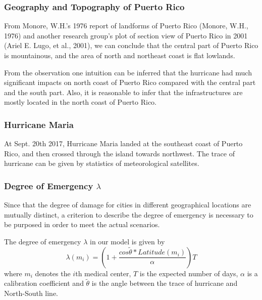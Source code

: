 \documentclass[12pt]{article}
\begin{document}
			\subsubsection{Geography and Topography of Puerto Rico}
			From Monore, W.H.'s 1976 report of landforms of Puerto Rico (Monore, W.H., 1976) and another research group's plot of section view of Puerto Rico in 2001 (Ariel E. Lugo, et al., 2001), we can conclude that the central part of Puerto Rico is mountainous, and the area of north and northeast coast is flat lowlands. 
			\begin{figure}[H]
				\centering
			\end{figure}
			From the observation one intuition can be inferred that the hurricane had much significant impacts on north coast of Puerto Rico compared with the central part and the south part. Also, it is reasonable to infer that the infrastructures are mostly located in the north coast of Puerto Rico. 
			
			\subsubsection{Hurricane Maria}
			\begin{figure}[H]
				\centering
			\end{figure}
			At Sept. 20th 2017, Hurricane Maria landed at the southeast coast of Puerto Rico, and then crossed through the island towards northwest. The trace of hurricane can be given by statistics of meteorological satellites.
			
			\subsubsection{Degree of Emergency \textit{$\lambda$}}
			Since that the degree of damage for cities in different geographical locations are mutually distinct, a criterion to describe the degree of emergency is necessary to be purposed in order to meet the actual scenarios.\par 
			The degree of emergency $\lambda$ in our model is given by
			\begin{equation}
				\lambda(m_i) = (1 + \frac{cos \tilde{\theta} * Latitude(m_i)}{\alpha}) T
			\end{equation}
			where $m_i$ denotes the $i$th medical center, $T$ is the expected number of days, $\alpha$ is a calibration coefficient and $\tilde{\theta}$ is the angle between the trace of hurricane and North-South line.
			
\end{document}
